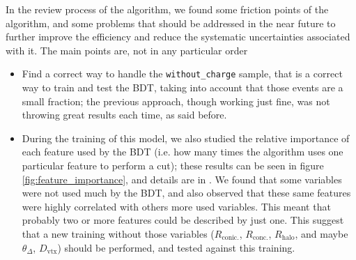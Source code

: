 In the review process of the algorithm, we found some friction points of the algorithm, and some problems that should be addressed in the near future to further improve the efficiency and reduce the systematic uncertainties associated with it. The main points are, not in any particular order \begin{itemize}
    \item Find a correct way to handle the \texttt{without\_charge} sample, that is a correct way to train and test the BDT, taking into account that those events are a small fraction; the previous approach, though working just fine, was not throwing great results each time, as said before. 
    \item During the training of this model, we also studied the relative importance of each feature used by the BDT (i.e. how many times the algorithm uses one particular feature to perform a cut); these results can be seen in figure \ref{fig:feature_importance}, and details are in \cite{Sotgia:2024a}. We found that some variables were not used much by the BDT, and also observed that these same features were highly correlated with others more used variables. This meant that probably two or more features could be described by just one. This suggest that a new training without those variables ($R_\mathrm{conic.}$, $R_\mathrm{conc.}$, $R_\mathrm{halo}$, and maybe $\theta_\Delta$, $D_\mathrm{vtx}$) should be performed, and tested against this training. 
\end{itemize}